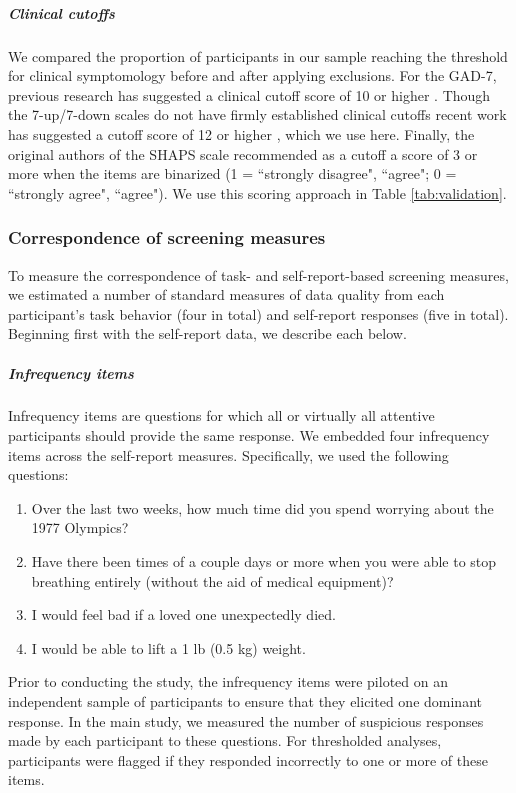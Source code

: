\documentclass[a4paper,notitlepage,12pt]{article}
\begin{document}
\begin{refsection}[main]
\subparagraph{Clinical cutoffs} We compared the proportion of participants in our sample reaching the threshold for clinical symptomology before and after applying exclusions. For the GAD-7, previous research has suggested a clinical cutoff score of 10 or higher \cite{lowe2008validation, hinz2017psychometric}. Though the 7-up/7-down scales do not have firmly established clinical cutoffs recent work has suggested a cutoff score of 12 or higher \cite{youngstrom2020evaluating}, which we use here. Finally, the original authors of the SHAPS scale recommended as a cutoff a score of 3 or more when the items are binarized (1 = ``strongly disagree", ``agree"; 0 = ``strongly agree", ``agree"). We use this scoring approach in Table \ref{tab:validation}.   

\subsubsection{Correspondence of screening measures}

To measure the correspondence of task- and self-report-based screening measures, we estimated a number of standard measures of data quality from each participant's task behavior (four in total) and self-report responses (five in total). Beginning first with the self-report data, we describe each below.

\subparagraph{Infrequency items} 

Infrequency items are questions for which all or virtually all attentive participants should provide the same response. We embedded four infrequency items across the self-report measures. Specifically, we used the following questions:

\begin{enumerate}
  \item Over the last two weeks, how much time did you spend worrying about the 1977 Olympics? 
  \item Have there been times of a couple days or more when you were able to stop breathing entirely (without the aid of medical equipment)?
  \item I would feel bad if a loved one unexpectedly died.
  \item I would be able to lift a 1 lb (0.5 kg) weight.
\end{enumerate}

Prior to conducting the study, the infrequency items were piloted on an independent sample of participants to ensure that they elicited one dominant response. In the main study, we measured the number of suspicious responses made by each participant to these questions. For thresholded analyses, participants were flagged if they responded incorrectly to one or more of these items.


\end{refsection}
\end{document}
